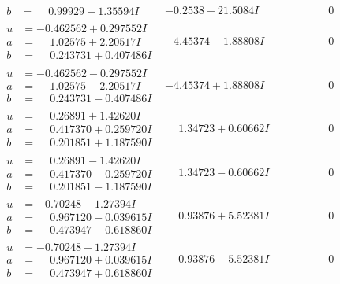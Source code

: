 \documentclass[1p]{elsarticle_modified}
\theoremstyle{definition}
\begin{document}
$$\begin{array}{c|c|c}
\begin{aligned}
b &= \phantom{-}0.99929 - 1.35594 I\end{aligned}
 & -0.2538 + 21.5084 I & \phantom{-0.000000 } 0 \\ \hline\begin{aligned}
u &= -0.462562 + 0.297552 I \\
a &= \phantom{-}1.02575 + 2.20517 I \\
b &= \phantom{-}0.243731 + 0.407486 I\end{aligned}
 & -4.45374 - 1.88808 I & \phantom{-0.000000 } 0 \\ \hline\begin{aligned}
u &= -0.462562 - 0.297552 I \\
a &= \phantom{-}1.02575 - 2.20517 I \\
b &= \phantom{-}0.243731 - 0.407486 I\end{aligned}
 & -4.45374 + 1.88808 I & \phantom{-0.000000 } 0 \\ \hline\begin{aligned}
u &= \phantom{-}0.26891 + 1.42620 I \\
a &= \phantom{-}0.417370 + 0.259720 I \\
b &= \phantom{-}0.201851 + 1.187590 I\end{aligned}
 & \phantom{-}1.34723 + 0.60662 I & \phantom{-0.000000 } 0 \\ \hline\begin{aligned}
u &= \phantom{-}0.26891 - 1.42620 I \\
a &= \phantom{-}0.417370 - 0.259720 I \\
b &= \phantom{-}0.201851 - 1.187590 I\end{aligned}
 & \phantom{-}1.34723 - 0.60662 I & \phantom{-0.000000 } 0 \\ \hline\begin{aligned}
u &= -0.70248 + 1.27394 I \\
a &= \phantom{-}0.967120 - 0.039615 I \\
b &= \phantom{-}0.473947 - 0.618860 I\end{aligned}
 & \phantom{-}0.93876 + 5.52381 I & \phantom{-0.000000 } 0 \\ \hline\begin{aligned}
u &= -0.70248 - 1.27394 I \\
a &= \phantom{-}0.967120 + 0.039615 I \\
b &= \phantom{-}0.473947 + 0.618860 I\end{aligned}
 & \phantom{-}0.93876 - 5.52381 I & \phantom{-0.000000 } 0\\

\end{array}$$
\end{document}
